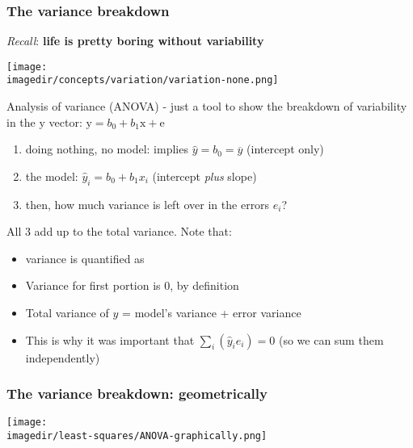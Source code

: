 \begin{frame}\frametitle{The variance breakdown}

	\emph{Recall}: \textbf{life is pretty boring without variability}
	\begin{center}
		\texttt{[image: \\imagedir/concepts/variation/variation-none.png]}
	\end{center}

	Analysis of variance (ANOVA) - just a tool to show the breakdown of variability in the $\mathrm{y}$ vector: $\mathrm{y} = b_0 + b_1 \mathrm{x} + \mathrm{e}$
	\begin{enumerate}
		\item	doing nothing, no model: implies $\hat{y} = b_0 = \overline{y}$ (intercept only)
		\item	the model: $\hat{y}_i = b_0 + b_1 x_i$ (intercept \emph{plus} slope)
		\item	then, how much variance is left over in the errors $e_i$?
	\end{enumerate}
	\vspace{12pt}
	All 3 add up to the total variance. Note that:
	\begin{itemize}
		\item	variance is quantified as {\color{orange}{deviation from the mean}}
		\item	Variance for first portion is 0, by definition
		\item	Total variance of $y$ = model's variance + error variance
		\item	This is why it was important that $\sum_i{(\hat{y}_i e_i)} = 0$ (so we can sum them independently)
	\end{itemize}
\end{frame}

\begin{frame}\frametitle{The variance breakdown: geometrically}
	\begin{center}
		\texttt{[image: \\imagedir/least-squares/ANOVA-graphically.png]}
	\end{center}
\end{frame}

